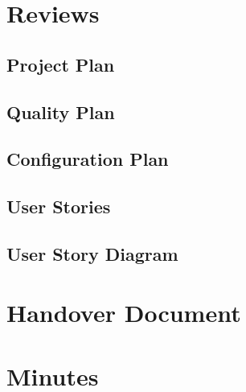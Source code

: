 \chapter{Reviews}

\section{Project Plan}




\section{Quality Plan}


\section{Configuration Plan}


\section{User Stories}




\section{User Story Diagram}



\chapter{Handover Document}


\chapter{Minutes}
